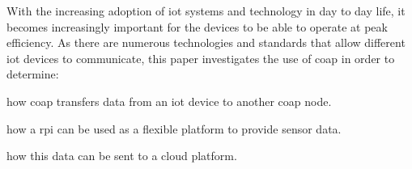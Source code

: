 With the increasing adoption of \gls{iot} systems and technology in day to day
life, it becomes increasingly important for the devices to be able to operate
at peak efficiency. As there are numerous technologies and standards that allow
different \gls{iot} devices to communicate, this paper investigates the use
of \gls{coap} in order to determine:
\begin{enumerate*}
    \item how \gls{coap} transfers data from an \gls{iot} device to another \gls{coap} node.
    \item how a \gls{rpi} can be used as a flexible platform to provide sensor data.
    \item how this data can be sent to a cloud platform.
\end{enumerate*}